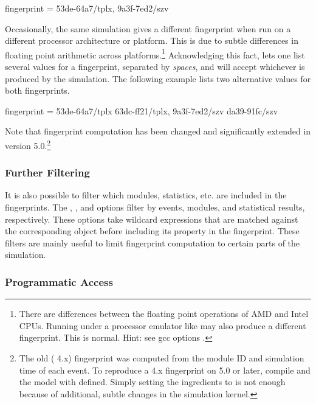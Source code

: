 \begin{inifile}
fingerprint = 53de-64a7/tplx, 9a3f-7ed2/szv
\end{inifile}

Occasionally, the same simulation gives a different fingerprint when run on
a different processor architecture or platform. This is due to subtle
differences in floating point arithmetic across platforms.\footnote{There
are differences between the floating point operations of AMD and Intel
CPUs. Running under a processor emulator like  may also
produce a different fingerprint. This is normal. Hint: see gcc options
.} Acknowledging this fact, {\opp} lets one list
several values for a fingerprint, separated by \textit{spaces}, and will
accept whichever is produced by the simulation. The following example lists
two alternative values for both fingerprints.

\begin{inifile}
fingerprint = 53de-64a7/tplx 63dc-ff21/tplx, 9a3f-7ed2/szv da39-91fc/szv
\end{inifile}

Note that fingerprint computation has been changed and significantly
extended in {\opp} version 5.0.\footnote{The old ({\opp} 4.x) fingerprint
was computed from the module ID and simulation time of each event. To
reproduce a 4.x fingerprint on {\opp} 5.0 or later, compile {\opp} and the
model with  defined. Simply setting the
ingredients to  is not enough because of additional, subtle changes
in the simulation kernel.}


\subsubsection{Further Filtering}
\label{sec:testing:fingerprint-further-filtering}

It is also possible to filter which modules, statistics, etc. are included
in the fingerprints. The ,
, and  options
filter by events, modules, and statistical results, respectively. These
options take wildcard expressions that are matched against the
corresponding object before including its property in the fingerprint.
These filters are mainly useful to limit fingerprint computation to certain
parts of the simulation.

\subsubsection{Programmatic Access}
\label{sec:testing:fingerprint-programmatic-access}

